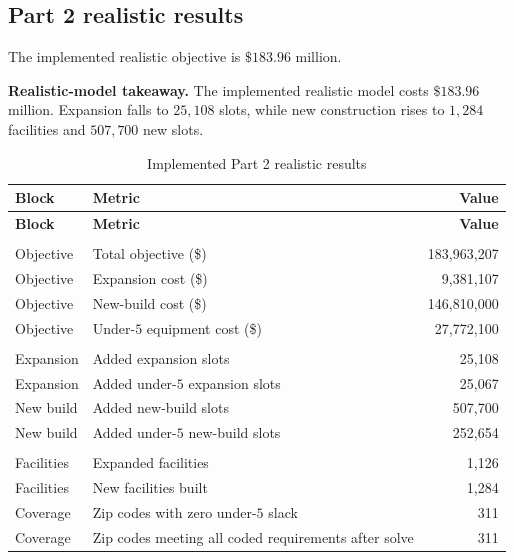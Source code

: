 \documentclass[11pt]{article}
\begin{document}
\subsection{Part 2 realistic results}

The implemented realistic objective is \(\$183.96\) million.

\begin{resultbox}
\textbf{Realistic-model takeaway.}
The implemented realistic model costs \(\$183.96\) million. Expansion falls to \(25{,}108\) slots, while new construction rises to \(1{,}284\) facilities and \(507{,}700\) new slots.
\end{resultbox}

\begingroup
\small
\renewcommand{\arraystretch}{1.05}
\begin{longtable}{L{2.4cm}L{8.0cm}r}
\caption{Implemented Part 2 realistic results}\label{tab:part2-results}\\
\toprule
\textbf{Block} & \textbf{Metric} & \textbf{Value} \\
\midrule
\endfirsthead
\toprule
\textbf{Block} & \textbf{Metric} & \textbf{Value} \\
\midrule
\endhead
\bottomrule
\endfoot
\bottomrule
\endlastfoot
{} \\
Objective & Total objective (\$) & 183,963,207 \\
Objective & Expansion cost (\$) & 9,381,107 \\
Objective & New-build cost (\$) & 146,810,000 \\
Objective & Under-\(5\) equipment cost (\$) & 27,772,100 \\
\addlinespace[2pt]
 \\
Expansion & Added expansion slots & 25,108 \\
Expansion & Added under-\(5\) expansion slots & 25,067 \\
New build & Added new-build slots & 507,700 \\
New build & Added under-\(5\) new-build slots & 252,654 \\
\addlinespace[2pt]
 \\
Facilities & Expanded facilities & 1,126 \\
Facilities & New facilities built & 1,284 \\
Coverage & Zip codes with zero under-\(5\) slack & 311 \\
Coverage & Zip codes meeting all coded requirements after solve & 311 \\
\end{longtable}
\endgroup
\end{document}
